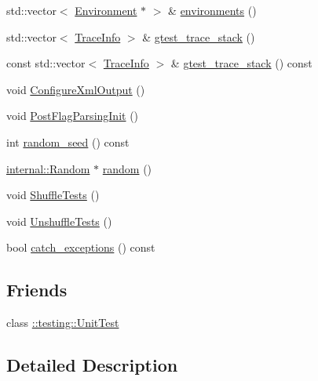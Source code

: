 \begin{DoxyCompactItemize}
\item 
std\+::vector$<$ \hyperlink{classtesting_1_1_environment}{Environment} $\ast$ $>$ \& \hyperlink{classtesting_1_1internal_1_1_unit_test_impl_aa1489e6a2378d64d68bc01963ea5db4a}{environments} ()
\item 
std\+::vector$<$ \hyperlink{structtesting_1_1internal_1_1_trace_info}{Trace\+Info} $>$ \& \hyperlink{classtesting_1_1internal_1_1_unit_test_impl_af8c7c0a0c954e36d83e6e4690d3fb938}{gtest\+\_\+trace\+\_\+stack} ()
\item 
const std\+::vector$<$ \hyperlink{structtesting_1_1internal_1_1_trace_info}{Trace\+Info} $>$ \& \hyperlink{classtesting_1_1internal_1_1_unit_test_impl_a1fa664f26839f3192f63afb502dee09d}{gtest\+\_\+trace\+\_\+stack} () const 
\item 
void \hyperlink{classtesting_1_1internal_1_1_unit_test_impl_a21cd7b2928de03a55b5252f29dd5ae6d}{Configure\+Xml\+Output} ()
\item 
void \hyperlink{classtesting_1_1internal_1_1_unit_test_impl_a772894193104b1b2516f16e6ff813168}{Post\+Flag\+Parsing\+Init} ()
\item 
int \hyperlink{classtesting_1_1internal_1_1_unit_test_impl_a8ec59a7ab3bad96bccde98ce85ffc864}{random\+\_\+seed} () const 
\item 
\hyperlink{classtesting_1_1internal_1_1_random}{internal\+::\+Random} $\ast$ \hyperlink{classtesting_1_1internal_1_1_unit_test_impl_ab3b45b5eb4d583219a3602011ea44347}{random} ()
\item 
void \hyperlink{classtesting_1_1internal_1_1_unit_test_impl_aaaa38e6a4372e6bb9bbe3143a3a32b65}{Shuffle\+Tests} ()
\item 
void \hyperlink{classtesting_1_1internal_1_1_unit_test_impl_a1ee7db3bf8284dd9dce4dc857564bce3}{Unshuffle\+Tests} ()
\item 
bool \hyperlink{classtesting_1_1internal_1_1_unit_test_impl_a0bbc6e237776ee6afaee106fe83e0406}{catch\+\_\+exceptions} () const 
\end{DoxyCompactItemize}
\subsection*{Friends}
\begin{DoxyCompactItemize}
\item 
class \hyperlink{classtesting_1_1internal_1_1_unit_test_impl_a893404438388dec058dc5c02e8f9a014}{\+::testing\+::\+Unit\+Test}
\end{DoxyCompactItemize}


\subsection{Detailed Description}


